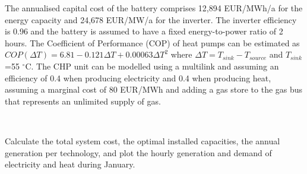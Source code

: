 \documentclass[10pt]{article}
\newenvironment{problem}[2][Problem]{\begin{trivlist}
\item[\hskip \labelsep {\bfseries #1}\hskip \labelsep {\bfseries #2.}]}{\end{trivlist}}
\begin{document}
\begin{problem}{11.1}
The annualised capital cost of the battery comprises 12,894 EUR/MWh/a for the energy capacity and 24,678 EUR/MW/a for the inverter. The inverter efficiency is 0.96 and the battery is assumed to have a fixed energy-to-power ratio of 2 hours. The Coefficient of Performance (COP) of heat pumps can be estimated as $COP (\Delta T) = 6.81 - 0.121 \Delta T + 0.00063 \Delta T^2$ where  $\Delta T = T_{sink} - T_{source}$ and $T_{sink}$=55 $^{\circ}$C. The  CHP unit can be modelled using a multilink and assuming an efficiency of 0.4 when producing electricity and 0.4 when producing heat, assuming a marginal cost of 80 EUR/MWh and adding a gas store to the gas bus that represents an unlimited supply of gas.

\

Calculate the total system cost, the optimal installed capacities, the annual generation per technology, and plot the hourly generation and demand of electricity and heat during January.

\


\end{problem}

\
\end{document}
